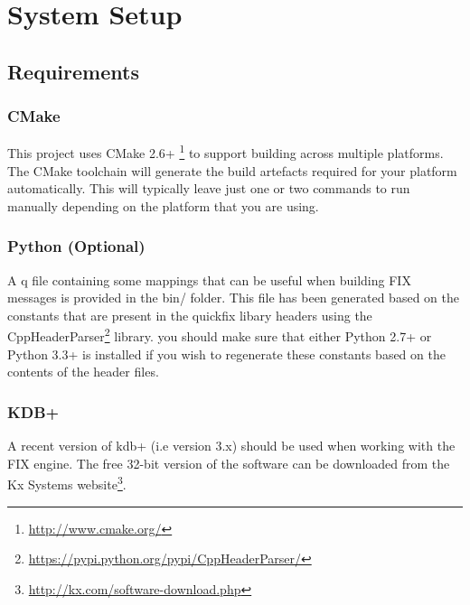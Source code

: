\chapter{System Setup}


\section{Requirements}

\subsection{CMake}

This project uses CMake 2.6+ \footnote{\url{http://www.cmake.org/}} to support building across multiple platforms. The CMake toolchain will generate the build artefacts required for your platform automatically. This will typically leave just one or two commands to run manually depending on the platform that you are using.

\subsection{Python (Optional)}
A q file containing some mappings that can be useful when building FIX messages is provided in the bin/ folder. This file has been generated based on the constants that are present in the quickfix libary headers using the CppHeaderParser\footnote{\url{https://pypi.python.org/pypi/CppHeaderParser/}} library. you should make sure that either Python 2.7+ or Python 3.3+ is installed if you wish to regenerate these constants based on the contents of the header files.

\subsection{KDB+}
A recent version of kdb+ (i.e version 3.x) should be used when working with the FIX engine. The free 32-bit version of the software can be downloaded from the Kx Systems website\footnote{\url{http://kx.com/software-download.php}}.

